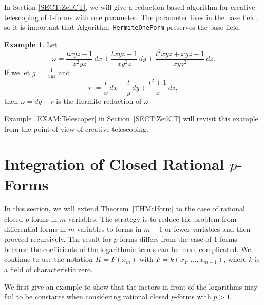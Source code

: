 \documentclass{amsart}
\theoremstyle{definition}
\newtheorem{example}[thm]{Example}
\numberwithin{equation}{section}
\numberwithin{thm}{section}
\begin{document}
In Section \ref{SECT:ZeilCT}, we will give a reduction-based algorithm for creative telescoping of 1-forms with one parameter.  The parameter lives in the base field, so it is important that Algorithm~\texttt{HermiteOneForm} preserves the base field.

\begin{example} \label{EXAM:Hermite}
	Let
	\[\omega = \frac{txyz-1}{x^2yz} \, dx + \frac{txyz-1}{xy^2z}\, dy + \frac{t^2xyz+xyz-1}{xyz^2}\, dz.\]
	If we let $g := \frac{1}{xyz}$ and
	\[r:= \frac{t}{x} \, dx+ \frac{t}{y} \, dy + \frac{t^2+1}{z}\, dz,\]
	then $\omega = dg+r$ is the Hermite reduction of $\omega$.
\end{example}

Example~\ref{EXAM:Telescoper} in Section~\ref{SECT:ZeilCT} will revisit this example from the point of view of creative telescoping.

\section{Integration of Closed Rational $p$-Forms}
\label{SECT:pform}

In this section, we will extend Theorem~\ref{THM:1form} to the case of rational closed $p$-forms in $m$ variables. The strategy is to reduce the problem from differential forms in $m$ variables to forms in $m-1$ or fewer variables and then proceed recursively. The result for $p$-forms differs from the case of 1-forms because the coefficients of the  logarithmic terms can be more complicated. We continue to use the notation $K = F(x_m)$ with $F = k(x_1, \ldots, x_{m-1})$, where $k$ is a field of characteristic zero.

We first give an example to show that the factors in front of the logarithms may fail to be constants when considering rational closed $p$-forms with $p > 1$.
\end{document}
